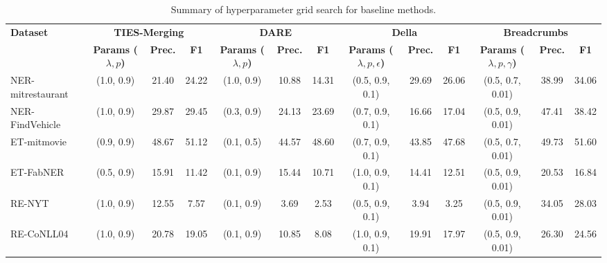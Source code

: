 \begin{table}[htbp]
\centering
\caption{Summary of hyperparameter grid search for baseline methods. }
\label{tab:grid_search_summary}
\vspace{-2mm}
\setlength{\tabcolsep}{2.5pt}
\begin{tabular}{l|ccc|ccc|ccc|ccc}
\toprule
\multirow{2}{*}{\textbf{Dataset}} & \multicolumn{3}{c|}{\textbf{TIES-Merging}} & \multicolumn{3}{c|}{\textbf{DARE}} & \multicolumn{3}{c|}{\textbf{Della}} & \multicolumn{3}{c}{\textbf{Breadcrumbs}} \\
\cmidrule(lr){2-4} \cmidrule(lr){5-7} \cmidrule(lr){8-10} \cmidrule(l){11-13}
& \textbf{Params ($\lambda, p$)} & \textbf{Prec.} & \textbf{F1} & \textbf{Params ($\lambda, p$)} & \textbf{Prec.} & \textbf{F1} & \textbf{Params ($\lambda, p, \epsilon$)} & \textbf{Prec.} & \textbf{F1} & \textbf{Params ($\lambda, p, \gamma$)} & \textbf{Prec.} & \textbf{F1} \\
\midrule
NER-mitrestaurant & (1.0, 0.9) & 21.40 & 24.22 & (1.0, 0.9) & 10.88 & 14.31 & (0.5, 0.9, 0.1) & 29.69 & 26.06 & (0.5, 0.7, 0.01) & 38.99 & 34.06 \\
NER-FindVehicle   & (1.0, 0.9) & 29.87 & 29.45 & (0.3, 0.9) & 24.13 & 23.69 & (0.7, 0.9, 0.1) & 16.66 & 17.04 & (0.5, 0.9, 0.01) & 47.41 & 38.42 \\
ET-mitmovie       & (0.9, 0.9) & 48.67 & 51.12 & (0.1, 0.5) & 44.57 & 48.60 & (0.7, 0.9, 0.1) & 43.85 & 47.68 & (0.5, 0.7, 0.01) & 49.73 & 51.60 \\
ET-FabNER         & (0.5, 0.9) & 15.91 & 11.42 & (0.1, 0.9) & 15.44 & 10.71 & (1.0, 0.9, 0.1) & 14.41 & 12.51 & (0.5, 0.9, 0.01) & 20.53 & 16.84 \\
RE-NYT            & (1.0, 0.9) & 12.55 & 7.57  & (0.1, 0.9) & 3.69  & 2.53  & (0.5, 0.9, 0.1) & 3.94  & 3.25  & (0.5, 0.9, 0.01) & 34.05 & 28.03 \\
RE-CoNLL04        & (1.0, 0.9) & 20.78 & 19.05 & (0.1, 0.9) & 10.85 & 8.08  & (1.0, 0.9, 0.1) & 19.91 & 17.97 & (0.5, 0.9, 0.01) & 26.30 & 24.56 \\
\bottomrule
\end{tabular}
\vspace{-2mm}
\end{table}

